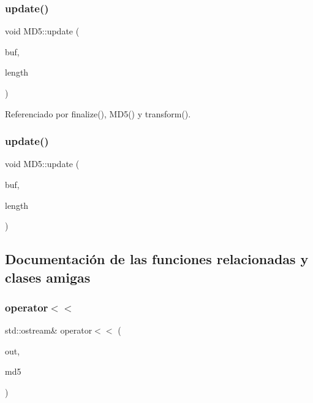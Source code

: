 \subsubsection{\texorpdfstring{update()}{update()}\hspace{0.1cm}{\footnotesize\ttfamily [1/2]}}
{\footnotesize\ttfamily void M\+D5\+::update (\begin{DoxyParamCaption}\item[{const unsigned char $\ast$}]{buf,  }\item[{\hyperlink{classMD5_aa836972700679dbcff6ae8337f6db464}{size\+\_\+type}}]{length }\end{DoxyParamCaption})}



Referenciado por finalize(), M\+D5() y transform().

\hypertarget{classMD5_ac5ccba375539b993958fb235f8ac849c}{}\label{classMD5_ac5ccba375539b993958fb235f8ac849c} 
\subsubsection{\texorpdfstring{update()}{update()}\hspace{0.1cm}{\footnotesize\ttfamily [2/2]}}
{\footnotesize\ttfamily void M\+D5\+::update (\begin{DoxyParamCaption}\item[{const char $\ast$}]{buf,  }\item[{\hyperlink{classMD5_aa836972700679dbcff6ae8337f6db464}{size\+\_\+type}}]{length }\end{DoxyParamCaption})}



\subsection{Documentación de las funciones relacionadas y clases amigas}
\hypertarget{classMD5_a0739666fd0f3a7117546f6c50e0783b2}{}\label{classMD5_a0739666fd0f3a7117546f6c50e0783b2} 
\subsubsection{\texorpdfstring{operator$<$$<$}{operator<<}}
{\footnotesize\ttfamily std\+::ostream\& operator$<$$<$ (\begin{DoxyParamCaption}\item[{std\+::ostream \&}]{out,  }\item[{\hyperlink{classMD5}{M\+D5}}]{md5 }\end{DoxyParamCaption})\hspace{0.3cm}{\ttfamily [friend]}}



